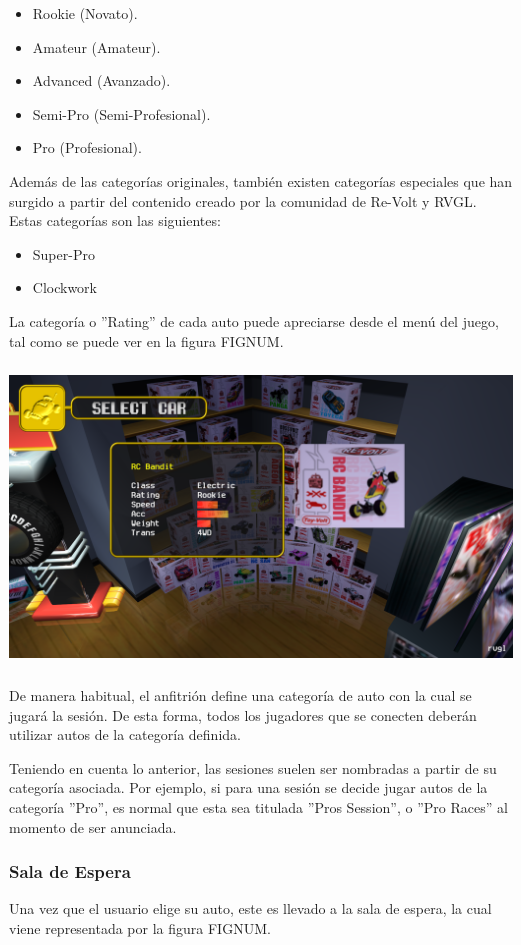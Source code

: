 \begin{itemize}
	\item Rookie (Novato).
	\item Amateur (Amateur).
	\item Advanced (Avanzado).
	\item Semi-Pro (Semi-Profesional).
	\item Pro (Profesional).
\end{itemize}

Además de las categorías originales, también existen categorías especiales que han surgido a partir del contenido creado por la comunidad de Re-Volt y RVGL. Estas categorías son las siguientes:

\begin{itemize}
	\item Super-Pro
	\item Clockwork
\end{itemize}

La categoría o ''Rating'' de cada auto puede apreciarse desde el menú del juego, tal como se puede ver en la figura FIGNUM.

\includegraphics[width=15cm, height=8cm]{img/bandit.png}

De manera habitual, el anfitrión define una categoría de auto con la cual se jugará la sesión. De esta forma, todos los jugadores que se conecten deberán utilizar autos de la categoría definida.

Teniendo en cuenta lo anterior, las sesiones suelen ser nombradas a partir de su categoría asociada. Por ejemplo, si para una sesión se decide jugar autos de la categoría ''Pro'', es normal que esta sea titulada  ''Pros Session'', o ''Pro Races'' al momento de ser anunciada.

\subsubsection{Sala de Espera}
Una vez que el usuario elige su auto, este es llevado a la sala de espera, la cual viene representada por la figura FIGNUM.

